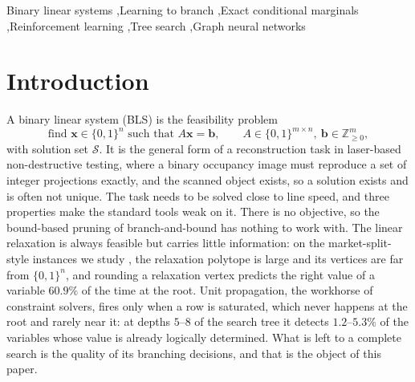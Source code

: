 \documentclass[final,5p,times,twocolumn,authoryear]{elsarticle}
\newcommand{\SOL}{\mathcal{S}}
\begin{document}
\begin{frontmatter}
\begin{keyword}
Binary linear systems \sep Learning to branch \sep Exact conditional marginals \sep Reinforcement learning \sep Tree search \sep Graph neural networks
\end{keyword}

\end{frontmatter}

\section{Introduction}
\label{sec:intro}

A binary linear system (BLS) is the feasibility problem
\begin{equation}
\text{find } \mathbf{x}\in\{0,1\}^n \text{ such that } A\mathbf{x}=\mathbf{b},\qquad A\in\{0,1\}^{m\times n},\ \mathbf{b}\in\mathbb{Z}_{\ge0}^m,
\label{eq:bls}
\end{equation}
with solution set $\SOL$. It is the general form of a reconstruction task in laser-based non-destructive testing, where a binary occupancy image must reproduce a set of integer projections exactly, and the scanned object exists, so a solution exists and is often not unique. The task needs to be solved close to line speed, and three properties make the standard tools weak on it. There is no objective, so the bound-based pruning of branch-and-bound has nothing to work with. The linear relaxation is always feasible but carries little information: on the market-split-style instances we study \citep{cornuejols1999class}, the relaxation polytope is large and its vertices are far from $\{0,1\}^n$, and rounding a relaxation vertex predicts the right value of a variable $60.9\%$ of the time at the root. Unit propagation, the workhorse of constraint solvers, fires only when a row is saturated, which never happens at the root and rarely near it: at depths $5$--$8$ of the search tree it detects $1.2$--$5.3\%$ of the variables whose value is already logically determined. What is left to a complete search is the quality of its branching decisions, and that is the object of this paper.
\end{document}

